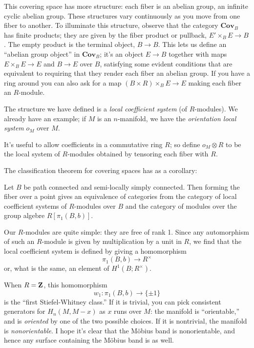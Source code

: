 This covering space has more structure: each fiber is an abelian group,
an infinite cyclic abelian group. These structures vary continuously 
as you move from one fiber to another. To illuminate this structure,
observe that the category $\mathbf{Cov}_B$ has finite products; they are
given by the fiber product or pullback, $E'\times_BE\to B$. The empty
product is the terminal object, $B\to B$. This lets us define an ``abelian
group object'' in $\mathbf{Cov}_B$; it's an object $E\to B$ together with
maps $E\times_BE\to E$ and $B\to E$ over $B$, satisfying some evident
conditions that are equivalent to requiring that they render each fiber
an abelian group. If you have a ring around you can also ask for a map
$(B\times R)\times_BE\to E$ making each fiber an $R$-module. 

The structure we  have defined is a {\em local coefficient system} (of 
$R$-modules). We already have an example; if $M$ is an $n$-manifold, 
we have the {\em orientation local system} $o_M$ over $M$. 

It's useful to allow coefficients in a commutative ring $R$; so define
$o_M\otimes R$ to be the local system of $R$-modules obtained by tensoring
each fiber with $R$. 

The classification theorem for covering spaces has as a corollary:
\begin{theorem} 
Let $B$ be path connected and semi-locally simply connected.
Then forming the fiber over a point gives an equivalence of categories from
the category of local coefficient systems of $R$-modules over $B$
and the category of modules over the group algebre $R[\pi_1(B,b)]$. 
\end{theorem}

Our $R$-modules are quite simple: they are free of rank 1. Since any 
automorphism of such an $R$-module is given by multiplication by a unit
in $R$, we find that the local coefficient system is defined by 
giving a homomorphism 
\[
\pi_1(B,b)\to R^\times
\]
or, what is the same, an element of $H^1(B;R^\times)$. 

When $R=\mathbf Z$, this homomorphism
\[
w_1:\pi_1(B,b)\to\{\pm1\}
\]
is the ``first Stiefel-Whitney class.'' If it is trivial, you can pick
consistent generators for $H_n(M,M-x)$ as $x$ runs over $M$: the manifold
is ``orientable,'' and is {\em oriented} by one of the two possible choices. 
If it is nontrivial, the manifold is {\em nonorientable}. I hope it's clear
that the M\"obius band is nonorientable, and hence any surface containing
the M\"obius band is as well. 

